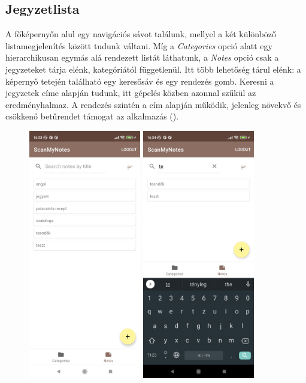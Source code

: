 \subsection{Jegyzetlista}
A főképernyőn alul egy navigációs sávot találunk, mellyel a két különböző listamegjelenítés között tudunk váltani. Míg a \emph{Categories} opció alatt egy hierarchikusan egymás alá rendezett listát láthatunk, a \emph{Notes} opció csak a jegyzeteket tárja elénk, kategóriától függetlenül. Itt több lehetőség tárul elénk: a képernyő tetején található egy keresősáv és egy rendezés gomb. Keresni a jegyzetek címe alapján tudunk, itt gépelés közben azonnal szűkül az eredményhalmaz. A rendezés szintén a cím alapján működik, jelenleg növekvő és csökkenő betűrendet támogat az alkalmazás (). 

\begin{figure}[!ht]
	\centering
	\includegraphics[width=49mm, keepaspectratio]{figures/notelist_full.jpg}
	\includegraphics[width=49mm, keepaspectratio]{figures/notelist_search.jpg}

\end{figure}
